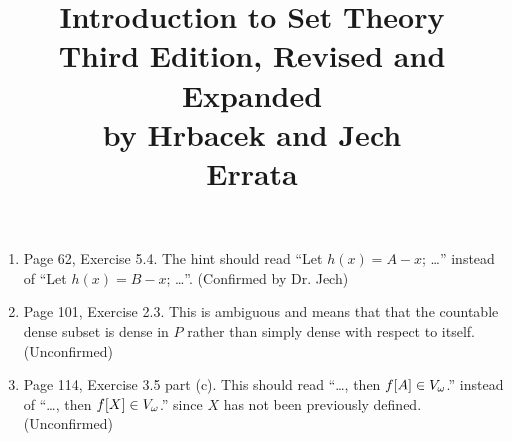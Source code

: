 \documentclass{report}
\title{
  Introduction to Set Theory \\
  Third Edition, Revised and Expanded \\
  by Hrbacek and Jech \\
  Errata
}
\begin{document}


\maketitle

\begin{enumerate}

\item Page 62, Exercise 5.4. The hint should read ``Let $h(x) = A - x$; \ldots'' instead of ``Let $h(x) = B - x$; \ldots''.
  (Confirmed by Dr. Jech)

\item Page 101, Exercise 2.3. This is ambiguous and means that that the countable dense subset is dense in $P$ rather than simply dense with respect to itself. (Unconfirmed)

\item Page 114, Exercise 3.5 part (c). This should read ``\ldots, then $f[A] \in V_\omega$.'' instead of ``\ldots, then $f[X] \in V_\omega$.'' since $X$ has not been previously defined. (Unconfirmed)

\end{enumerate}
\end{document}
